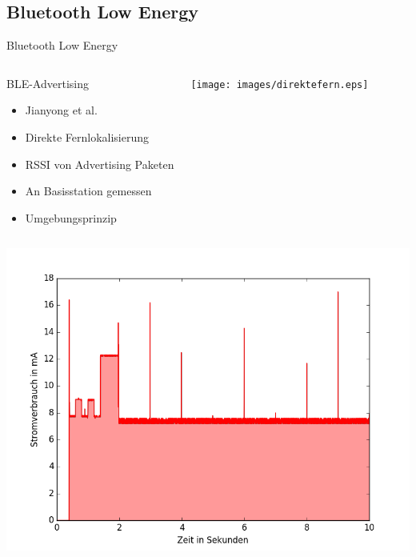 \documentclass[18pt]{beamer}
\begin{document}
\subsection{Bluetooth Low Energy}
\begin{frame}{Bluetooth Low Energy}
	\begin{columns}
			\begin{block}{BLE-Advertising}
				\begin{itemize}
					\item Jianyong et al. \cite{jianyong2014rssi}
					\item Direkte Fernlokalisierung
					\item RSSI von Advertising Paketen
					\item An Basisstation gemessen
					\item Umgebungsprinzip
				\end{itemize}
			\end{block}
			\centering
			\texttt{[image: images/direktefern.eps]}
	\end{columns}
\end{frame}

\begin{frame}
	\begin{minipage}[c][\textheight][c]{\textwidth}
		\centering
		\includegraphics[height=0.95\textheight]{plots/blue.png}
	\end{minipage}
\end{frame}
\end{document}
